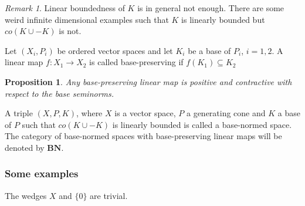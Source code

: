 \documentclass[12pt]{article}
\newtheorem{prop}{Proposition}
\theoremstyle{remark}
\newtheorem{rem}{Remark}
\newcommand{\<}{\langle}
\newcommand{\ct}[1]{\mathbf{#1}}
\begin{document}
\begin{rem} Linear boundedness of $K$ is in general not enough. There are some weird infinite dimensional examples such that $K$ is linearly bounded but $co(K\cup -K)$ is not.

\end{rem}

Let $(X_i,P_i)$ be ordered vector spaces and let $K_i$ be a base of $P_i$, $i=1,2$.  A linear map $f:X_1\to X_2$ is called base-preserving if $f(K_1)\subseteq K_2$

\begin{prop}  
 Any base-preserving linear  map  is  positive and contractive with respect to the base seminorms.
\end{prop}

A triple $(X,P,K)$, where $X$ is a vector space, $P$ a generating cone and $K$ a base of $P$ such that $co(K\cup-K)$ is linearly bounded is called a base-normed space. 
The category of base-normed spaces with base-preserving linear maps will be denoted by $\ct{BN}$.

\subsubsection*{Some examples}

The wedges $X$ and $\{0\}$ are trivial.
\end{document}
